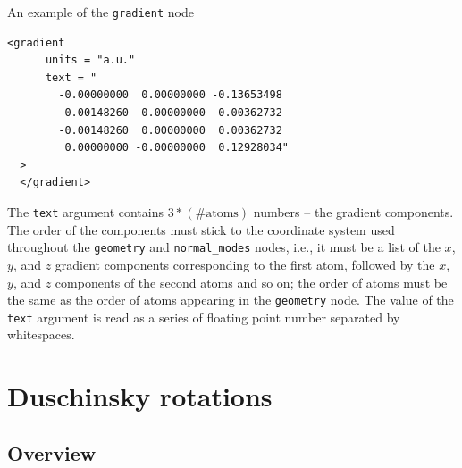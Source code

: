 \documentclass[11pt]{article}
\begin{document}
An example of the {\tt{}gradient} node
\begin{lstlisting}[frame=single,framerule=0pt]
  <gradient
      units = "a.u."
      text = "
        -0.00000000  0.00000000 -0.13653498  
         0.00148260 -0.00000000  0.00362732  
        -0.00148260  0.00000000  0.00362732  
         0.00000000 -0.00000000  0.12928034"
  >
  </gradient>
\end{lstlisting}
The \texttt{text} argument contains $3*(\textrm{\# atoms})$ numbers -- the gradient components. The order of the components must stick to the coordinate system used throughout the \texttt{geometry} and \texttt{normal\_modes} nodes, i.e., it must be a list of the $x$, $y$, and $z$ gradient components corresponding to the first atom, followed by the $x$, $y$, and $z$ components of the second atoms and so on; the order of atoms must be the same as the order of atoms appearing in the \texttt{geometry} node. The value of the \texttt{text} argument is read as a series of floating point number separated by whitespaces.

\section{Duschinsky rotations}
\label{sec:dushinsky}

\subsection{Overview}
\label{sec:dhush:overview}
\end{document}
